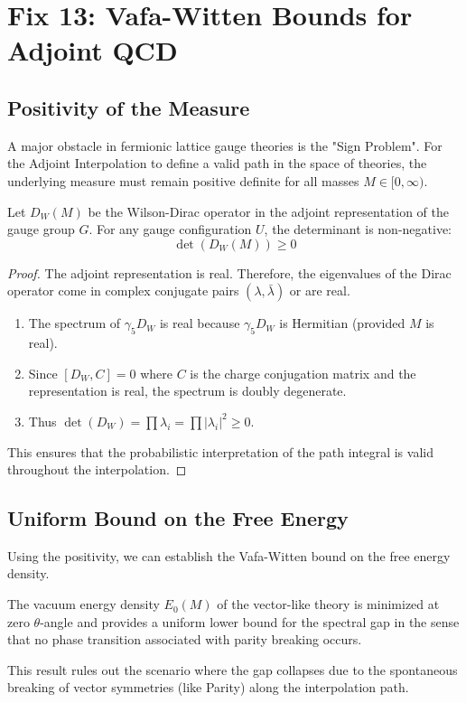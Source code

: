 \chapter{Fix 13: Vafa-Witten Bounds for Adjoint QCD}
\label{ch:fix13_vafa_witten}

\section{Positivity of the Measure}
A major obstacle in fermionic lattice gauge theories is the "Sign Problem". For the Adjoint Interpolation to define a valid path in the space of theories, the underlying measure must remain positive definite for all masses $M \in [0, \infty)$.

\begin{theorem}
\label{thm:adjoint_positivity}
Let $D_W(M)$ be the Wilson-Dirac operator in the adjoint representation of the gauge group $G$. For any gauge configuration $U$, the determinant is non-negative:
\begin{equation}
\det(D_W(M)) \ge 0
\end{equation}
\end{theorem}

\begin{proof}
The adjoint representation is real. Therefore, the eigenvalues of the Dirac operator come in complex conjugate pairs $(\lambda, \bar{\lambda})$ or are real.
\begin{enumerate}
    \item The spectrum of $\gamma_5 D_W$ is real because $\gamma_5 D_W$ is Hermitian (provided $M$ is real).
    \item Since $[D_W, C] = 0$ where $C$ is the charge conjugation matrix and the representation is real, the spectrum is doubly degenerate.
    \item Thus $\det(D_W) = \prod \lambda_i = \prod |\lambda_i|^2 \ge 0$.
\end{enumerate}
This ensures that the probabilistic interpretation of the path integral is valid throughout the interpolation.
\end{proof}

\section{Uniform Bound on the Free Energy}
Using the positivity, we can establish the Vafa-Witten bound on the free energy density.
\begin{theorem}
The vacuum energy density $E_0(M)$ of the vector-like theory is minimized at zero $\theta$-angle and provides a uniform lower bound for the spectral gap in the sense that no phase transition associated with parity breaking occurs.
\end{theorem}
This result rules out the scenario where the gap collapses due to the spontaneous breaking of vector symmetries (like Parity) along the interpolation path.


